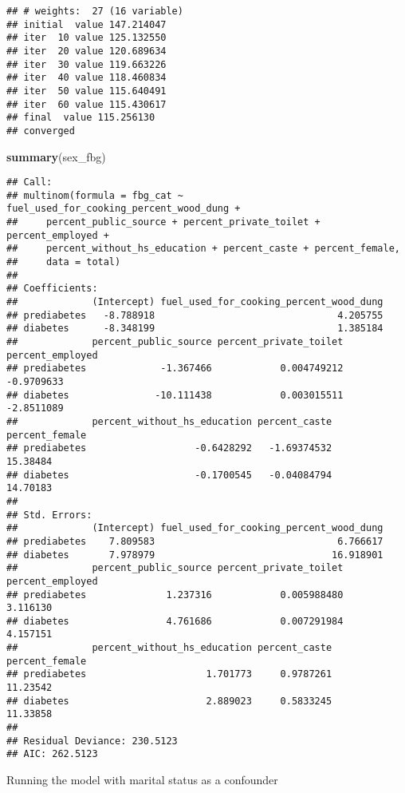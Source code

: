 \documentclass[]{article}
\newenvironment{Shaded}{\begin{snugshade}}{\end{snugshade}}
\newcommand{\KeywordTok}[1]{\textcolor[rgb]{0.13,0.29,0.53}{\textbf{#1}}}
\newcommand{\NormalTok}[1]{#1}
\begin{document}
\begin{verbatim}
## # weights:  27 (16 variable)
## initial  value 147.214047 
## iter  10 value 125.132550
## iter  20 value 120.689634
## iter  30 value 119.663226
## iter  40 value 118.460834
## iter  50 value 115.640491
## iter  60 value 115.430617
## final  value 115.256130 
## converged
\end{verbatim}

\begin{Shaded}
\begin{Highlighting}[]
\KeywordTok{summary}\NormalTok{(sex_fbg)}
\end{Highlighting}
\end{Shaded}

\begin{verbatim}
## Call:
## multinom(formula = fbg_cat ~ fuel_used_for_cooking_percent_wood_dung + 
##     percent_public_source + percent_private_toilet + percent_employed + 
##     percent_without_hs_education + percent_caste + percent_female, 
##     data = total)
## 
## Coefficients:
##             (Intercept) fuel_used_for_cooking_percent_wood_dung
## prediabetes   -8.788918                                4.205755
## diabetes      -8.348199                                1.385184
##             percent_public_source percent_private_toilet percent_employed
## prediabetes             -1.367466            0.004749212       -0.9709633
## diabetes               -10.111438            0.003015511       -2.8511089
##             percent_without_hs_education percent_caste percent_female
## prediabetes                   -0.6428292   -1.69374532       15.38484
## diabetes                      -0.1700545   -0.04084794       14.70183
## 
## Std. Errors:
##             (Intercept) fuel_used_for_cooking_percent_wood_dung
## prediabetes    7.809583                                6.766617
## diabetes       7.978979                               16.918901
##             percent_public_source percent_private_toilet percent_employed
## prediabetes              1.237316            0.005988480         3.116130
## diabetes                 4.761686            0.007291984         4.157151
##             percent_without_hs_education percent_caste percent_female
## prediabetes                     1.701773     0.9787261       11.23542
## diabetes                        2.889023     0.5833245       11.33858
## 
## Residual Deviance: 230.5123 
## AIC: 262.5123
\end{verbatim}

Running the model with marital status as a confounder
\end{document}
